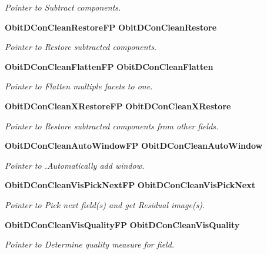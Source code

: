 \begin{CompactItemize}
\begin{CompactList}\small\item\em Pointer to Subtract components. \item\end{CompactList}\item 
{\bf Obit\-DCon\-Clean\-Restore\-FP} {\bf Obit\-DCon\-Clean\-Restore}
\begin{CompactList}\small\item\em Pointer to Restore subtracted components. \item\end{CompactList}\item 
{\bf Obit\-DCon\-Clean\-Flatten\-FP} {\bf Obit\-DCon\-Clean\-Flatten}
\begin{CompactList}\small\item\em Pointer to Flatten multiple facets to one. \item\end{CompactList}\item 
{\bf Obit\-DCon\-Clean\-XRestore\-FP} {\bf Obit\-DCon\-Clean\-XRestore}
\begin{CompactList}\small\item\em Pointer to Restore subtracted components from other fields. \item\end{CompactList}\item 
{\bf Obit\-DCon\-Clean\-Auto\-Window\-FP} {\bf Obit\-DCon\-Clean\-Auto\-Window}
\begin{CompactList}\small\item\em Pointer to .Automatically add window. \item\end{CompactList}\item 
{\bf Obit\-DCon\-Clean\-Vis\-Pick\-Next\-FP} {\bf Obit\-DCon\-Clean\-Vis\-Pick\-Next}
\begin{CompactList}\small\item\em Pointer to Pick next field(s) and get Residual image(s). \item\end{CompactList}\item 
{\bf Obit\-DCon\-Clean\-Vis\-Quality\-FP} {\bf Obit\-DCon\-Clean\-Vis\-Quality}
\begin{CompactList}\small\item\em Pointer to Determine quality measure for field. \item\end{CompactList}\item 

\end{CompactItemize}
